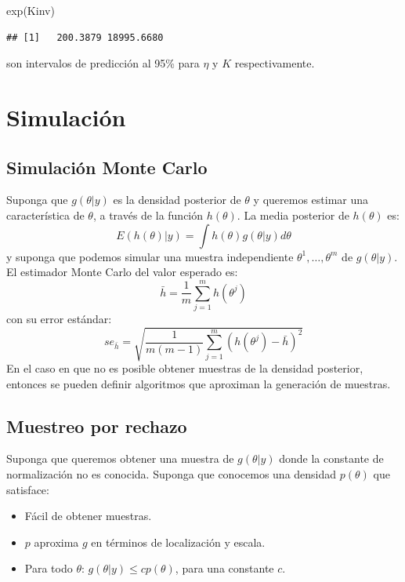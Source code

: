 \documentclass[
  12pt,
]{book}
\newenvironment{Shaded}{\begin{snugshade}}{\end{snugshade}}
\newcommand{\FunctionTok}[1]{\textcolor[rgb]{0.00,0.00,0.00}{#1}}
\newcommand{\NormalTok}[1]{#1}
\providecommand{\tightlist}{%
  \setlength{\itemsep}{0pt}\setlength{\parskip}{0pt}}
\begin{document}
\begin{Shaded}
\begin{Highlighting}[]
\FunctionTok{exp}\NormalTok{(Kinv)}
\end{Highlighting}
\end{Shaded}

\begin{verbatim}
## [1]   200.3879 18995.6680
\end{verbatim}

son intervalos de predicción al 95\% para \(\eta\) y \(K\)
respectivamente.

\hypertarget{simulaciuxf3n}{%
\section{Simulación}\label{simulaciuxf3n}}

\hypertarget{simulaciuxf3n-monte-carlo}{%
\subsection{Simulación Monte Carlo}\label{simulaciuxf3n-monte-carlo}}

Suponga que \(g(\theta|y)\) es la densidad posterior de \(\theta\) y
queremos estimar una característica de \(\theta\), a través de la
función \(h(\theta)\). La media posterior de \(h(\theta)\) es:
\[E(h(\theta)|y)=\int h(\theta)g(\theta|y)d\theta\] y suponga que
podemos simular una muestra independiente \(\theta^1,\ldots,\theta^m\)
de \(g(\theta|y)\). El estimador Monte Carlo del valor esperado es:
\[\bar h =\frac 1 m\sum_{j=1}^mh(\theta^j) \] con su error estándar:
\[se_{\bar h}=\sqrt{\frac{1}{m(m-1)}\sum_{j=1}^m\left(h(\theta^j)-\bar h\right)^2}\]
En el caso en que no es posible obtener muestras de la densidad
posterior, entonces se pueden definir algoritmos que aproximan la
generación de muestras.

\hypertarget{muestreo-por-rechazo}{%
\subsection{Muestreo por rechazo}\label{muestreo-por-rechazo}}

Suponga que queremos obtener una muestra de \(g(\theta|y)\) donde la
constante de normalización no es conocida. Suponga que conocemos una
densidad \(p(\theta)\) que satisface:

\begin{itemize}
\tightlist
\item
  Fácil de obtener muestras.
\item
  \(p\) aproxima \(g\) en términos de localización y escala.
\item
  Para todo \(\theta\): \(g(\theta|y)\leq cp(\theta)\), para una
  constante \(c\).
\end{itemize}
\end{document}
